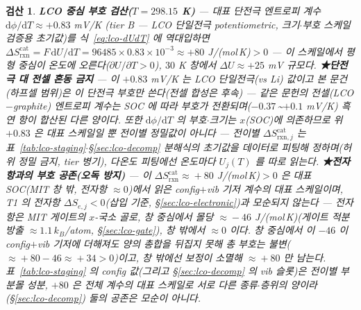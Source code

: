 \documentclass[11pt,a4paper]{article}
\newtheorem*{verifybox}{검산}
\newcommand{\dd}{\mathrm{d}}
\newcommand{\rxn}{\mathrm{rxn}}
\begin{document}
\begin{verifybox}
\textbf{LCO 중심 부호 검산($T=298.15$ K)} — 대표 단전극 엔트로피 계수 $\dd\phi/\dd T\approx+0.83$ mV/K\cite{swiderska2019}
(tier B — LCO \emph{단일전극} potentiometric, 크기$\cdot$부호 스케일 검증용 초기값)를 식~\eqref{eq:lco-dUdT}
에 역대입하면 $\Delta S_{\rxn}^\mathrm{cat}=F\,\dd U/\dd T=96485\times0.83\times10^{-3}\approx+80$ J/(mol\,K)$>0$ —
이 스케일에서 평형 중심이 온도에 \emph{오른다}($\partial U/\partial T>0$), $30$ K 창에서 $\Delta U\approx+25$ mV 규모다.
\textbf{★단전극 대 전셀 혼동 금지} — 이 $+0.83$ mV/K 는 \emph{LCO 단일전극}(vs Li) 값이고 본 문건(하프셀
범위)은 이 단전극 부호만 쓴다(전셀 합성은 후속) — 같은 문헌의 \emph{전셀}(LCO$-$graphite) 엔트로피 계수는
SOC 에 따라 부호가 전환되며($-0.37$\,\textasciitilde$+0.1$ mV/K) 흑연 항이 합산된 다른 양이다. 또한
$\dd\phi/\dd T$ 의 부호$\cdot$크기는 $x$(SOC)에 의존하므로 위 $+0.83$ 은 \emph{대표 스케일}일 뿐 전이별
정밀값이 아니다 — 전이별 $\Delta S_{\rxn,j}^\mathrm{cat}$ 는 표~\ref{tab:lco-staging}$\cdot$\S\ref{sec:lco-decomp}
분해식의 초기값을 데이터로 피팅해 정하며(허위 정밀 금지, tier 병기), 다온도 피팅에선 온도마다 $U_j(T)$ 를 따로 읽는다.
\textbf{★전자항과의 부호 공존(오독 방지)} — 이 $\Delta S_{\rxn}^\mathrm{cat}\!\approx\!+80$ J/(mol\,K)$>0$ 은
대표 SOC(MIT 창 \emph{밖}, 전자항 $\approx\!0$)에서 읽은 config$+$vib 기저 계수의 \emph{대표 스케일}이며,
T1 의 전자항 $\Delta S_{e,j}<0$(삽입 기준, \S\ref{sec:lco-electronic})과 모순되지 않는다 — 전자항은 MIT 게이트의
$x$-\emph{국소 골}로, 창 중심에서 몰당 $\approx\!-46$ J/(mol\,K)(게이트 적분 방출 $\approx\!1.1\,k_B$/atom,
\S\ref{sec:lco-gate}), 창 밖에서 $\approx\!0$ 이다. 창 중심에서 이 $-46$ 이 config$+$vib 기저에 더해져도 양의 총합을
뒤집지 못해 \emph{총 부호는 불변}($\approx\!+80-46\approx\!+34>0$)이고, 창 밖에선 보정이 소멸해 $\approx\!+80$ 만 남는다. 표~\ref{tab:lco-staging}
의 config 값(그리고 \S\ref{sec:lco-decomp} 의 vib 슬롯)은 \emph{전이별 부분몰} 성분, $+80$ 은 \emph{전체 계수}의 대표 스케일로 \emph{서로 다른
종류$\cdot$층위의 양}이라(\S\ref{sec:lco-decomp}) 둘의 공존은 모순이 아니다.
\end{verifybox}
\end{document}
